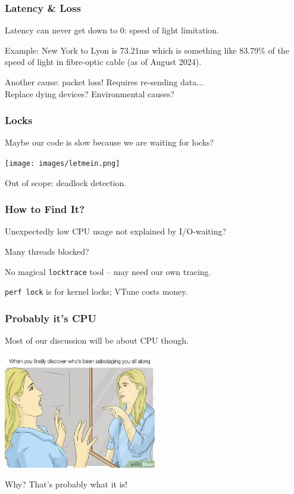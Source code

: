 \begin{frame}
\frametitle{Latency \& Loss}

Latency can never get down to 0: speed of light limitation.

Example: New York to Lyon is 73.21ms which is something like 83.79\% of the speed of light in fibre-optic cable (as of August 2024).

Another cause: packet loss! Requires re-sending data...\\
\quad Replace dying devices? Environmental causes?

\end{frame}


\begin{frame}
\frametitle{Locks}

Maybe our code is slow because we are waiting for locks?

\begin{center}
	\texttt{[image: images/letmein.png]}
\end{center}

Out of scope: deadlock detection.

\end{frame}


\begin{frame}
\frametitle{How to Find It?}

Unexpectedly low CPU usage not explained by I/O-waiting?

Many threads blocked?

No magical \texttt{locktrace} tool -- may need our own tracing.

\texttt{perf lock} is for kernel locks; VTune costs money.

\end{frame}


\begin{frame}
\frametitle{Probably it's CPU}

Most of our discussion will be about CPU though.

\begin{center}
  \includegraphics[width=0.5\textwidth]{images/sabotage.jpg}
\end{center}

Why? That's probably what it is!


\end{frame}


